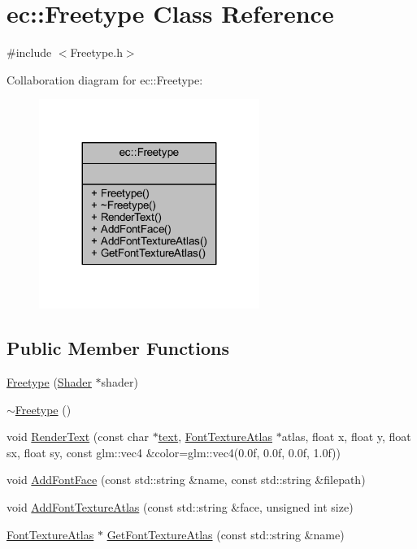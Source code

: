 \hypertarget{classec_1_1_freetype}{}\section{ec\+:\+:Freetype Class Reference}
\label{classec_1_1_freetype}


{\ttfamily \#include $<$Freetype.\+h$>$}



Collaboration diagram for ec\+:\+:Freetype\+:\nopagebreak
\begin{figure}[H]
\begin{center}
\leavevmode
\includegraphics[width=203pt]{classec_1_1_freetype__coll__graph}
\end{center}
\end{figure}
\subsection*{Public Member Functions}
\begin{DoxyCompactItemize}
\item 
\mbox{\hyperlink{classec_1_1_freetype_a77da5cdd8b053a5fea7c5ffd78c39418}{Freetype}} (\mbox{\hyperlink{classec_1_1_shader}{Shader}} $\ast$shader)
\item 
\mbox{\hyperlink{classec_1_1_freetype_a35e8fad09705600cdd263ed3781d299b}{$\sim$\+Freetype}} ()
\item 
void \mbox{\hyperlink{classec_1_1_freetype_a261c78852689e058598806fe66c39300}{Render\+Text}} (const char $\ast$\mbox{\hyperlink{namespaceec_a5de6bdb8c4b2ed6e590e721ec998f964a1cb251ec0d568de6a929b520c4aed8d1}{text}}, \mbox{\hyperlink{classec_1_1_font_texture_atlas}{Font\+Texture\+Atlas}} $\ast$atlas, float x, float y, float sx, float sy, const glm\+::vec4 \&color=glm\+::vec4(0.\+0f, 0.\+0f, 0.\+0f, 1.\+0f))
\item 
void \mbox{\hyperlink{classec_1_1_freetype_afd97735b55445abf79289deccba26f31}{Add\+Font\+Face}} (const std\+::string \&name, const std\+::string \&filepath)
\item 
void \mbox{\hyperlink{classec_1_1_freetype_a7d2e7d19b11c6ba77d4573684db0236d}{Add\+Font\+Texture\+Atlas}} (const std\+::string \&face, unsigned int size)
\item 
\mbox{\hyperlink{classec_1_1_font_texture_atlas}{Font\+Texture\+Atlas}} $\ast$ \mbox{\hyperlink{classec_1_1_freetype_a0bb0fcf03be07a5d9dc46a4b165c9194}{Get\+Font\+Texture\+Atlas}} (const std\+::string \&name)
\end{DoxyCompactItemize}


